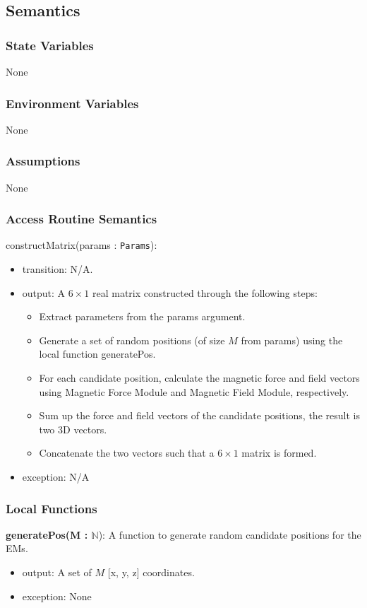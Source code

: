 \documentclass[12pt, titlepage]{article}
\begin{document}
\subsection{Semantics}

\subsubsection{State Variables}
None

\subsubsection{Environment Variables}
None

\subsubsection{Assumptions}
None 

\subsubsection{Access Routine Semantics}

\noindent constructMatrix(params : \texttt{Params}):
\begin{itemize}
\item transition: N/A.
\item output: A $6 \times 1$ real matrix constructed through the following steps:
\begin{itemize}
  \item Extract parameters from the params argument. 
  \item Generate a set of random positions (of size $M$ from params) using the local function generatePos.
  \item For each candidate position, calculate the magnetic force and field vectors using Magnetic Force Module and Magnetic Field Module, respectively. 
  \item Sum up the force and field vectors of the candidate positions, the result is two 3D vectors. 
  \item Concatenate the two vectors such that a $6 \times 1$ matrix is formed.
\end{itemize}
\item exception: N/A
\end{itemize}

\subsubsection{Local Functions}
\textbf{generatePos(M : $\mathbb{N}$}): A function to generate random candidate positions for the EMs. 
\begin{itemize}
  \item output: A set of $M$ [x, y, z] coordinates. 
  \item exception: None
\end{itemize}
\end{document}

